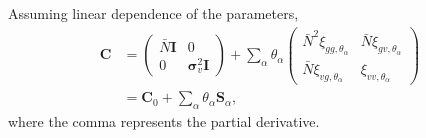 \documentclass{article}
\begin{document}
Assuming linear dependence of the parameters,
\begin{align}
\textbf{C} 
&=
\left(
\begin{array}{cc}
\bar{N}\textbf{I} & 0 \nonumber \\
0 & \bm{\sigma}_v^2\textbf{I}
\end{array}
\right)
+ \sum_\alpha \theta_\alpha
\begin{pmatrix}
\bar{N}^2\xi_{gg,{\theta_\alpha}} & \bar{N}\xi_{g v,{\theta_\alpha}} \\
\bar{N}\xi_{v g,{\theta_\alpha}} & \xi_{vv,{\theta_\alpha}}
\end{pmatrix}\\
&=
\textbf{C}_0
+ \sum_\alpha \theta_\alpha \textbf{S}_\alpha,
\end{align} 
where the comma represents the partial derivative.
\end{document}
